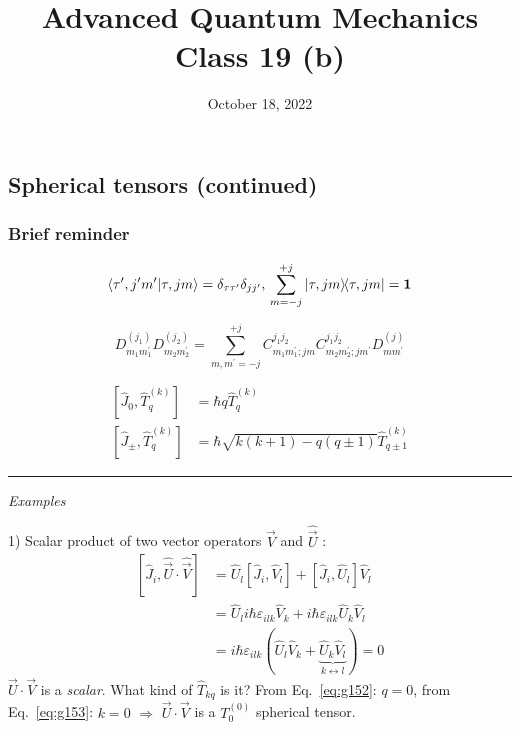 \documentclass[12pt]{article}
\title{Advanced Quantum Mechanics\\Class 19 (b)}
\date{October 18, 2022}                                           %
\newcommand{\be}{\begin{equation}}
\newcommand{\ee}{\end{equation}}
\begin{document}
\maketitle


\subsection{Spherical tensors (continued)}

\subsubsection{Brief reminder}

\setcounter{equation}{74}
\be
\bra{\tau^\prime,j^\prime m^\prime}
\ket{\tau,j m} = \delta_{\tau\tau^\prime}\delta_{jj^\prime},\,
\sum_{m=-j}^{+j}\op{\tau,j m} = \mathbf{1}
\label{eq:g76}
\ee

\setcounter{equation}{133}
\be
D_{m_{1} m_{1}^{\prime}}^{\left(j_{1}\right)} D_{m_{2} m_{2}^{\prime}}^{\left(j_{2}\right)}=\sum_{m, m^{\prime}=-j}^{+j} C_{m_{1} m_{1}^{\prime} ; j m}^{j_{1} j_{2}} C_{m_{2} m_{2}^{\prime} ; j m^{\prime}}^{j_{1} j_{2}} D_{m m^{\prime}}^{(j)}
\label{eq:g134}
\ee

\setcounter{equation}{151}

\begin{align} 
{\left[\hat{J}_{0}, \hat{T}_{q}^{(k)}\right] } &=\hbar q \hat{T}_{q}^{(k)} \label{eq:g152}\\ 
{\left[\hat{J}_{\pm}, \hat{T}_{q}^{(k)}\right] } &=\hbar \sqrt{k(k+1)-q(q \pm 1)} \hat{T}_{q \pm 1}^{(k)}  \label{eq:g153}
\end{align}



\setcounter{equation}{155}

\par\noindent\rule{\textwidth}{1.0pt}

\emph{Examples}

1) Scalar product of two vector operators \(\hat{\vec{V}}\) and \(\hat{\vec{U}}\) :
\be
\begin{aligned} 
{\left[\hat{J}_{i}, \hat{\vec{U}} \cdot \hat{\vec{V}}\right] } 
&=\hat{U}_{l}\left[\hat{J}_{i}, \hat{V}_{l}\right]+
\left[\hat{J}_{i},\hat{U}_{l}\right] \hat{V}_{l}\\
&= \hat{U}_{l} i \hbar \varepsilon_{i l k} \hat{V}_{k} + i \hbar \varepsilon_{i l k} \hat{U}_{k} \hat{V}_{l} \\ 
& = i \hbar \varepsilon_{i l k} (\hat{U}_{l} \hat{V}_{k}+ 
\underbrace{\hat{U}_{k} \hat{V}_{l}}_{k\leftrightarrow l})=0
\end{aligned}
\ee
$\vec{U}\cdot\vec{V}$ is a \emph{scalar}. What kind of $\hat{T}_{kq}$ is it?
From Eq.~\eqref{eq:g152}: \emph{$q=0$}, from Eq.~\eqref{eq:g153}: \emph{$k=0$} $\Rightarrow$
$\vec{U}\cdot\vec{V}$ is a $T_0^{(0)}$ spherical tensor.
\end{document}
